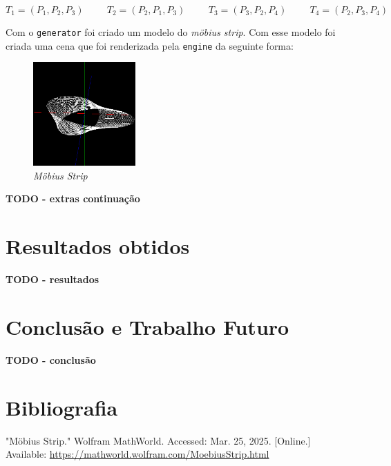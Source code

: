 \documentclass[12pt, a4paper]{article}
\begin{document}
$$
T_1 = (P_1, P_2, P_3)
\hspace{1cm}
T_2 = (P_2, P_1, P_3)
\hspace{1cm}
T_3 = (P_3, P_2, P_4)
\hspace{1cm}
T_4 = (P_2, P_3, P_4)
$$

Com o \texttt{generator} foi criado um modelo do \emph{möbius strip}. Com esse modelo
foi criada uma cena que foi renderizada pela \texttt{engine} da seguinte forma:

\begin{figure}[H]
    \centering
    \includegraphics[width=0.35\textwidth]{res/phase2/figures/MobiusStrip.png}
    \caption{\emph{Möbius Strip}}
\end{figure}

\textbf{\color{red} TODO - extras continuação}

\section{Resultados obtidos}

\textbf{\color{red} TODO - resultados}

\section{Conclusão e Trabalho Futuro}

\textbf{\color{red} TODO - conclusão}

\begingroup
\section{Bibliografia}
\renewcommand{\section}[2]{}

\begin{thebibliography}{9}
        "Möbius Strip."{} Wolfram MathWorld. Accessed: Mar. 25, 2025. [Online.] Available:
        \url{https://mathworld.wolfram.com/MoebiusStrip.html}
\end{thebibliography}
\endgroup
\end{document}
